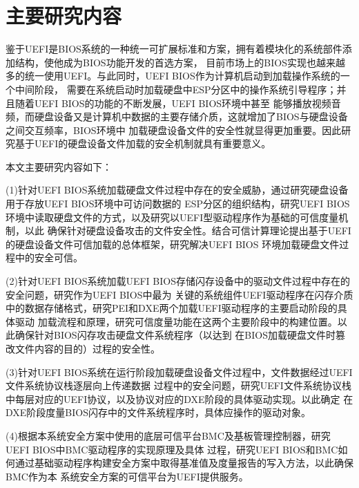 \section{主要研究内容}
鉴于UEFI是BIOS系统的一种统一可扩展标准和方案，拥有着模块化的系统部件添加结构，使他成为BIOS功能开发的首选方案，
目前市场上的BIOS实现也越来越多的统一使用UEFI。与此同时，UEFI BIOS作为计算机启动到加载操作系统的一个中间阶段，
需要在系统启动时加载硬盘中ESP分区中的操作系统引导程序；并且随着UEFI BIOS的功能的不断发展，UEFI BIOS环境中甚至
能够播放视频音频，而硬盘设备又是计算机中数据的主要存储介质，这就增加了BIOS与硬盘设备之间交互频率\cite{chinese10}，BIOS环境中
加载硬盘设备文件的安全性就显得更加重要。因此研究基于UEFI的硬盘设备文件加载的安全机制就具有重要意义。
\par 本文主要研究内容如下：
\par (1)针对UEFI BIOS系统加载硬盘文件过程中存在的安全威胁，通过研究硬盘设备用于存放UEFI BIOS环境中可访问数据的
ESP分区的组织结构，研究UEFI BIOS环境中读取硬盘文件的方式，以及研究以UEFI型驱动程序作为基础的可信度量机制，以此
确保针对硬盘设备攻击的文件安全性。结合可信计算理论提出基于UEFI的硬盘设备文件可信加载的总体框架，研究解决UEFI BIOS
环境加载硬盘文件过程中的安全可信。
\par (2)针对UEFI BIOS系统加载UEFI BIOS存储闪存设备中的驱动文件过程中存在的安全问题，研究作为UEFI BIOS中最为
关键的系统组件UEFI驱动程序在闪存介质中的数据存储格式，研究PEI和DXE两个加载UEFI驱动程序的主要启动阶段的具体驱动
加载流程和原理，研究可信度量功能在这两个主要阶段中的构建位置。以此确保针对BIOS闪存攻击硬盘文件系统程序（以达到
在BIOS加载硬盘文件时篡改文件内容的目的）过程的安全性。
\par (3)针对UEFI BIOS系统在运行阶段加载硬盘设备文件过程中，文件数据经过UEFI文件系统协议栈逐层向上传递数据
过程中的安全问题，研究UEFI文件系统协议栈中每层对应的UEFI协议，以及协议对应的DXE阶段的具体驱动实现。以此确定
在DXE阶段度量BIOS闪存中的文件系统程序时，具体应操作的驱动对象。
\par (4)根据本系统安全方案中使用的底层可信平台BMC及基板管理控制器，研究UEFI BIOS中BMC驱动程序的实现原理及具体
过程，研究UEFI BIOS和BMC如何通过基础驱动程序构建安全方案中取得基准值及度量报告的写入方法，以此确保BMC作为本
系统安全方案的可信平台为UEFI提供服务。

%
%
